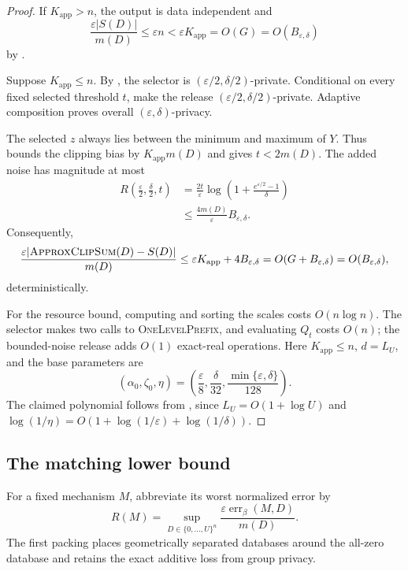 \documentclass[11pt]{article}
\begin{document}
\begin{proof}
If $K_{\mathrm{app}}>n$, the output is data independent and
\[
 \frac{\varepsilon|S(D)|}{m(D)}
 \le\varepsilon n<\varepsilon K_{\mathrm{app}}
 =O(G)=O(B_{\varepsilon,\delta})
\]
by .

Suppose $K_{\mathrm{app}}\le n$.  By
, the selector is
$(\varepsilon/2,\delta/2)$-private.  Conditional on every fixed selected
threshold $t$,  make the
release $(\varepsilon/2,\delta/2)$-private.  Adaptive composition proves
overall $(\varepsilon,\delta)$-privacy.

The selected $z$ always lies between the minimum and maximum of $Y$.
Thus  bounds the clipping bias by
$K_{\mathrm{app}}m(D)$ and gives $t<2m(D)$.  The added noise has magnitude at
most
\[
 \begin{aligned}
 R\left(\frac\varepsilon2,\frac\delta2,t\right)
 &=\frac{2t}{\varepsilon}
   \log\left(1+\frac{e^{\varepsilon/2}-1}{\delta}\right)\\
 &\le\frac{4m(D)}\varepsilon B_{\varepsilon,\delta}.
 \end{aligned}
\]
Consequently,
\[
 \frac{\varepsilon
 |\text{\textsc{ApproxClipSum}}(D)-S(D)|}{m(D)}
 \le\varepsilon K_{\mathrm{app}}+4B_{\varepsilon,\delta}
 =O(G+B_{\varepsilon,\delta})
 =O(B_{\varepsilon,\delta}),
\]
deterministically.

For the resource bound, computing and sorting the scales costs
$O(n\log n)$.  The selector makes two calls to
\textsc{OneLevelPrefix}, and evaluating $Q_t$ costs $O(n)$; the bounded-noise
release adds $O(1)$ exact-real operations.  Here $K_{\mathrm{app}}\le n$,
$d=L_U$, and the base parameters are
\[
 \left(\alpha_0,\zeta_0,\eta\right)
 =\left(\frac\varepsilon8,\frac\delta{32},
        \frac{\min\{\varepsilon,\delta\}}{128}\right).
\]
The claimed polynomial follows from
, since
$L_U=O(1+\log U)$ and
$\log(1/\eta)=O(1+\log(1/\varepsilon)+\log(1/\delta))$.
\end{proof}

\subsection{The matching lower bound}

For a fixed mechanism $M$, abbreviate its worst normalized error by
\[
 R(M)=\sup_{D\in\{0,\ldots,U\}^n}
 \frac{\varepsilon\operatorname{err}_{\beta}(M,D)}{m(D)}.
\]
The first packing places geometrically separated databases around the
all-zero database and retains the exact additive loss from group privacy.
\end{document}
